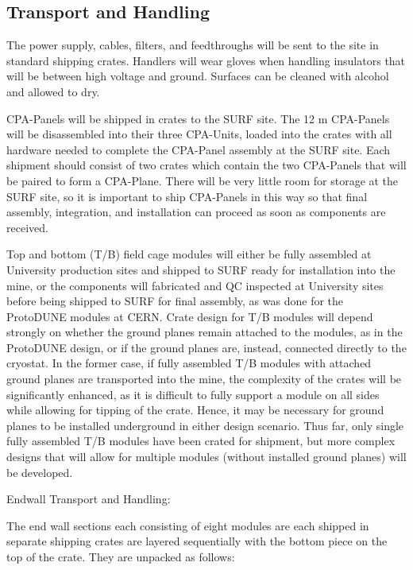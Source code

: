\subsection{Transport and Handling}
\label{sec:fdsp-hv-install-transport}

The power supply, cables, filters, and feedthroughs will be sent to the site in standard shipping crates.  Handlers will wear gloves when handling insulators that will be between high voltage and ground.  Surfaces can be cleaned with alcohol and allowed to dry.

CPA-Panels will be shipped in crates to the SURF site.  The 12 m CPA-Panels will be disassembled into their three CPA-Units, loaded into the crates with all hardware needed to complete the CPA-Panel assembly at the SURF site.  Each shipment should consist of two crates which contain the two CPA-Panels that will be paired to form a CPA-Plane. There will be very little room for storage at the SURF site, so it is important to ship CPA-Panels in this way so that final assembly, integration, and installation can proceed as soon as components are received.

Top and bottom (T/B) field cage modules will either be fully assembled at University production sites and shipped to SURF ready for installation into the mine, or the components will fabricated and QC inspected at University sites before being shipped to SURF for final assembly, as was done for the ProtoDUNE modules at CERN. Crate design for T/B modules will depend strongly on whether the ground planes remain attached to the modules, as in the ProtoDUNE design, or if the ground planes are, instead, connected directly to the cryostat. In the former case, if fully assembled T/B modules with attached ground planes are transported into the mine, the complexity of the crates will be significantly enhanced, as it is difficult to fully support a module on all sides while allowing for tipping of the crate. Hence, it may be necessary for ground planes to be installed underground in either design scenario. Thus far, only single fully assembled T/B modules have been crated for shipment, but more complex designs that will allow for multiple modules (without installed ground planes) will be developed.

Endwall Transport and Handling:

The end wall sections each consisting of eight modules are each shipped in separate shipping crates are layered sequentially with the bottom piece on the top of the crate.  They are unpacked as follows:


